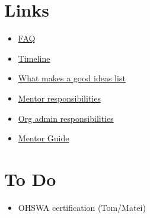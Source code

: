 \documentclass{article}
\begin{document}
\section{Links}

\begin{itemize}\item \href{https://developers.google.com/open-source/gsoc/faq}{FAQ}
\item \href{https://developers.google.com/open-source/gsoc/timeline}{Timeline}
\item \href{https://google.github.io/gsocguides/mentor/defining-a-project-ideas-list.html}{What makes a good ideas list}
\item \href{https://developers.google.com/open-source/gsoc/help/responsibilities#mentor_responsibilities}{Mentor responsibilities}
\item \href{https://developers.google.com/open-source/gsoc/help/responsibilities#org_admin_responsibilities}{Org admin responsibilities}
\item \href{https://google.github.io/gsocguides/mentor/}{Mentor Guide}
\end{itemize}


\section{To Do}

{\itshape 
\begin{itemize}
\item OHSWA certification (Tom/Matei)
\end{itemize}
}
\end{document}
